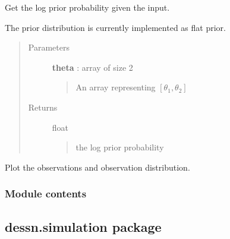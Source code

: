 \documentclass[letterpaper,10pt,english]{sphinxmanual}
\begin{document}
\begin{fulllineitems}
\begin{fulllineitems}
\label{dessn.simple:dessn.simple.exampleIntegral.ExampleIntegral.get_prior}
Get the log prior probability given the input.

The prior distribution is currently implemented as flat prior.
\begin{quote}\begin{description}
\item[{Parameters}] \leavevmode
\textbf{theta} : array of size 2
\begin{quote}

An array representing \([\theta_1,\theta_2]\)
\end{quote}

\item[{Returns}] \leavevmode
float
\begin{quote}

the log prior probability
\end{quote}

\end{description}\end{quote}

\end{fulllineitems}


\begin{fulllineitems}
\label{dessn.simple:dessn.simple.exampleIntegral.ExampleIntegral.plot_observations}
Plot the observations and observation distribution.

\end{fulllineitems}


\end{fulllineitems}



\subsubsection{Module contents}
\label{dessn.simple:module-contents}\label{dessn.simple:module-dessn.simple}

\subsection{dessn.simulation package}
\label{dessn.simulation:dessn-simulation-package}\label{dessn.simulation::doc}
\end{document}
